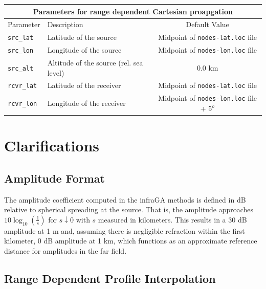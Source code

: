 \documentclass[10pt]{article}
\begin{document}
 \begin{tabular}{ | l | l | c | }
  \hline
  \multicolumn{3}{|c|}{\textbf{Parameters for range dependent Cartesian proapgation}} \\
  \hline
  Parameter & Description & Default Value \\
  \hline \hline
 \verb=src_lat= 			& Latitude of the source 								& Midpoint of \verb=nodes-lat.loc= file \\
 \verb=src_lon= 		& Longitude of the source								& Midpoint of \verb=nodes-lon.loc= file \\
 \verb=src_alt=  		& Altitude of the source (rel. sea level)					& \(0.0\) km \\ \hline
  \verb=rcvr_lat= 		& Latitude of the receiver								& Midpoint of \verb=nodes-lat.loc= file \\
  \verb=rcvr_lon= 		& Longitude of the receiver							& Midpoint of \verb=nodes-lon.loc= file  + \(5^o\) \\ \hline
\end{tabular}
 

\newpage
 \section{Clarifications} 
 \label{Sect:Clarifications}
 \subsection{Amplitude Format}
 \label{Sect:Clarifications:Amplitude}
 
 The amplitude coefficient computed in the infraGA methods is defined in dB relative to spherical spreading at the source.  That is, the amplitude approaches \( 10 \log_{10} \left( \frac{1}{s} \right)\) for \(s\downarrow 0\) with \(s\) measured in kilometers.  This results in a 30 dB amplitude at 1 m and, assuming there is negligible refraction within the first kilometer, 0 dB amplitude at 1 km, which functions as an approximate reference distance for amplitudes in the far field.
 
\subsection{Range Dependent Profile Interpolation}
 \label{Sect:Clarifications:RngDep}
\end{document}
